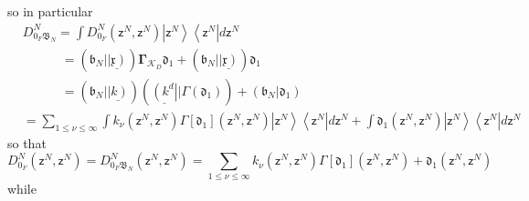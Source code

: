 \documentclass[aps,preprint]{revtex4}%
\begin{document}
so in particular%
\begin{align}
&  D_{0_{F}\mathfrak{B}_{N}}^{N}=%
{\displaystyle\int}
D_{0_{F}}^{N}\left(  \mathsf{z}^{N},\mathsf{z}^{N}\right)  \left\vert
\mathsf{z}^{N}\right\rangle \left\langle \mathsf{z}^{N}\right\vert
d\mathsf{z}^{N}\nonumber\\
&  \qquad\quad\left.  =\right.  \left(  \mathfrak{b}_{N}|\underline{\left\vert
\mathfrak{x}\right)  }\right)  \mathbf{\Gamma}_{\mathcal{K}_{D}}%
\mathfrak{d}_{1}+\left(  \mathfrak{b}_{N}|\underline{\left\vert \mathfrak{x}%
\right)  }\right)  \mathfrak{d}_{1}\nonumber\\
&  \qquad\quad\left.  =\right.  \left(  \mathfrak{b}_{N}|\underline{\left\vert
k\right)  }\right)  \left(  \underline{\left(  k^{d}\right\vert }%
|\Gamma\left(  \mathfrak{d}_{1}\right)  \right)  +\left(  \mathfrak{b}%
_{N}|\mathfrak{d}_{1}\right) \nonumber\\
&  \left.  =\right.
{\displaystyle\sum\limits_{1\leq\nu\leq\infty}}
{\displaystyle\int}
k_{\nu}\left(  \mathsf{z}^{N},\mathsf{z}^{N}\right)  \Gamma\left[
\mathfrak{d}_{1}\right]  \left(  \mathsf{z}^{N},\mathsf{z}^{N}\right)
\left\vert \mathsf{z}^{N}\right\rangle \left\langle \mathsf{z}^{N}\right\vert
d\mathsf{z}^{N}+\int\mathfrak{d}_{1}\left(  \mathsf{z}^{N},\mathsf{z}%
^{N}\right)  \left\vert \mathsf{z}^{N}\right\rangle \left\langle
\mathsf{z}^{N}\right\vert d\mathsf{z}^{N}%
\end{align}
so that
\begin{equation}
D_{0_{F}}^{N}\left(  \mathsf{z}^{N},\mathsf{z}^{N}\right)  =D_{0_{F}%
\mathfrak{B}_{N}}^{N}\left(  \mathsf{z}^{N},\mathsf{z}^{N}\right)  =%
{\displaystyle\sum\limits_{1\leq\nu\leq\infty}}
k_{\nu}\left(  \mathsf{z}^{N},\mathsf{z}^{N}\right)  \Gamma\left[
\mathfrak{d}_{1}\right]  \left(  \mathsf{z}^{N},\mathsf{z}^{N}\right)
+\mathfrak{d}_{1}\left(  \mathsf{z}^{N},\mathsf{z}^{N}\right)
\end{equation}
while
\end{document}

